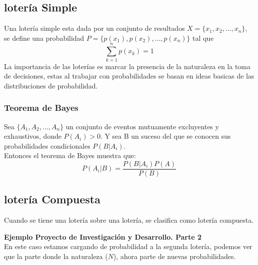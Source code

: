 \documentclass[12pt]{article}
\begin{document}
\subsection{lotería Simple}
Una lotería simple esta dada por un conjunto de resultados $X=\{x_1,x_2,...,x_n\}$, se define una probabilidad  $P=\{p(x_1),p(x_2),...,p(x_n)\}$ tal que $$\sum_{k=1}^np(x_k)=1$$
La importancia de las loterías es marcar la presencia de la naturaleza en la toma de decisiones, estas al trabajar con probabilidades se basan en ideas basicas de las distribuciones de probabilidad. 
\subsubsection{Teorema de Bayes}
Sea $\{A_1,A_2,...,A_n\}$ un conjunto de eventos mutuamente excluyentes y exhaustivos, donde $P(A_i)>0$. Y sea B un suceso del que se conocen sus probabilidades condicionales $P(B|A_i)$. \\
Entonces el teorema de Bayes muestra que: 
$$P(A_i|B)=\frac{P(B|A_i)P(A)}{P(B)}$$
\subsection{lotería Compuesta}
Cuando se tiene una lotería sobre una lotería, se clasifica como lotería compuesta. 
\begin{ejemplo}
    \textbf{Ejemplo Proyecto de Investigación y Desarrollo. Parte 2}\\
    En este caso estamos cargando de probabilidad a la segunda lotería, podemos ver que la parte donde la naturaleza ($N$), ahora parte de nuevas probabilidades. 
    \begin{figure} [H]
        \centering
        
        \label{fig:placeholder}
    \end{figure}
\end{ejemplo}
\end{document}
